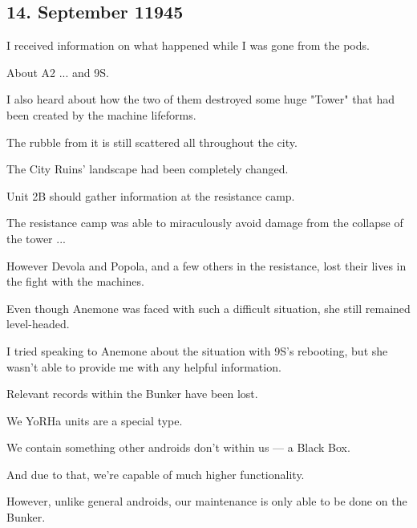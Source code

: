 \subsection{14. September 11945}
\begin{play}
  I received information on what happened while I was gone from the pods.

  About A2 ... and 9S.

  I also heard about how the two of them destroyed some huge "Tower" that had been created by the machine lifeforms.

  The rubble from it is still scattered all throughout the city.

  The City Ruins' landscape had been completely changed.

  Unit 2B should gather information at the resistance camp.

  The resistance camp was able to miraculously avoid damage from the collapse of the tower ...

  However Devola and Popola, and a few others in the resistance, lost their lives in the fight with the machines.

  Even though Anemone was faced with such a difficult situation, she still remained level-headed.

  I tried speaking to Anemone about the situation with 9S's rebooting, but she wasn't able to provide me with any helpful information.

  Relevant records within the Bunker have been lost.

  We YoRHa units are a special type.

  We contain something other androids don't within us — a Black Box.

  And due to that, we're capable of much higher functionality. 

  However, unlike general androids, our maintenance is only able to be done on the Bunker.


\end{play}

